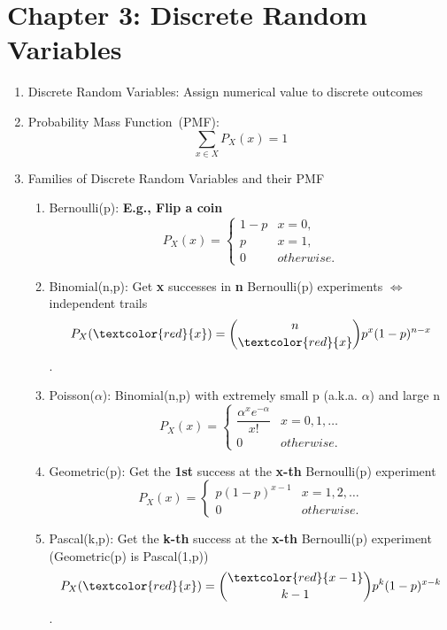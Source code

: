 \section*{Chapter 3: Discrete Random Variables}
\begin{enumerate}
    \item Discrete Random Variables: Assign numerical value to discrete outcomes
    \item Probability Mass Function~(PMF): $$\sum_{x\in X}P_X(x)=1$$ 
    \item Families of Discrete Random Variables and their PMF{
        \begin{enumerate}
            \item Bernoulli(p): \textbf{E.g., Flip a coin}{
                \[ P_X(x) = 
                \begin{cases}
                    1-p & x=0, \\
                    p   & x=1, \\
                    0   & otherwise.
                \end{cases} \]
            }
            \item Binomial(n,p): Get \textbf{x} successes in \textbf{n} Bernoulli(p) experiments $\iff$ independent trails{
                $$P_X(\textcolor{red}{x}) = \binom{n}{\textcolor{red}{x}}p^x(1-p)^{n-x}$$.
            }
            \item Poisson($\alpha$): Binomial(n,p) with extremely small p (a.k.a. $\alpha$) and large n{
                \[ P_X(x) = 
                \begin{cases}
                    \dfrac{\alpha^xe^{-\alpha}}{x!}   & x=0,1,\ldots \\
                    0   & otherwise.
                \end{cases} \]
            }
            \item Geometric(p): Get the \textbf{1st} success at the \textbf{x-th} Bernoulli(p) experiment {
                \[ P_X(x) = 
                \begin{cases}
                    p(1-p)^{x-1} & x=1,2,\ldots \\
                    0   & otherwise.
                \end{cases} \]
            }
            \item Pascal(k,p): Get the \textbf{k-th} success at the \textbf{x-th} Bernoulli(p) experiment (Geometric(p) is Pascal(1,p)){
                $$P_X(\textcolor{red}{x}) = \binom{\textcolor{red}{x-1}}{k-1}p^k(1-p)^{x-k}$$.
}
\end{enumerate}}
\end{enumerate}
